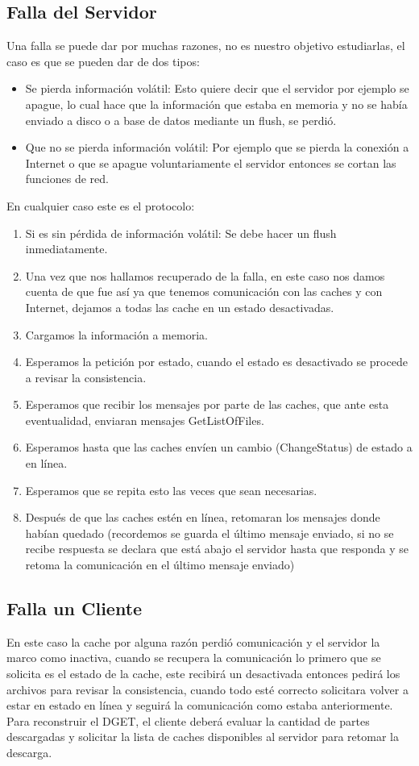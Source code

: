 \subsection{Falla del Servidor}
Una falla se puede dar por muchas razones, no es nuestro objetivo estudiarlas, el caso es que se pueden dar de dos tipos:

\begin{itemize}
\item Se pierda información volátil: Esto quiere decir que el servidor por ejemplo se apague, lo cual hace que la información que estaba en memoria y no se había enviado a disco o a base de datos mediante un flush, se perdió.
\item Que no se pierda información volátil: Por ejemplo que se pierda la conexión a Internet o que se apague voluntariamente el servidor entonces se cortan las funciones de red.
\end{itemize}

En cualquier caso este es el protocolo:

\begin{enumerate}
\item Si es sin pérdida de información volátil: Se debe hacer un flush inmediatamente.
\item Una vez que nos hallamos recuperado de la falla, en este caso nos damos cuenta de que fue así ya que tenemos comunicación con las caches y con Internet, dejamos a todas las cache en un estado desactivadas.
\item Cargamos la información a memoria.
\item Esperamos la petición por estado, cuando el estado es desactivado se procede a revisar la consistencia.
\item Esperamos que recibir los mensajes por parte de las caches, que ante esta eventualidad, enviaran mensajes GetListOfFiles.
\item Esperamos hasta que las caches envíen un cambio (ChangeStatus) de estado a en línea.
\item Esperamos que se repita esto las veces que sean necesarias.
\item Después de que las caches estén en línea, retomaran los mensajes donde habían quedado (recordemos se guarda el último mensaje enviado, si no se recibe respuesta se declara que está abajo el servidor hasta que responda y se retoma la comunicación en el último mensaje enviado)
\end{enumerate}

\subsection{Falla un Cliente}
En este caso la cache por alguna razón perdió comunicación y el servidor la marco como inactiva, cuando se recupera la comunicación lo primero que se solicita es el estado de la cache, este recibirá un desactivada entonces pedirá los archivos para revisar la consistencia, cuando todo esté correcto solicitara volver a estar en estado en línea y seguirá la comunicación como estaba anteriormente.
Para reconstruir el DGET, el cliente deberá evaluar la cantidad de partes descargadas y solicitar la lista de caches disponibles al servidor para retomar la descarga.

